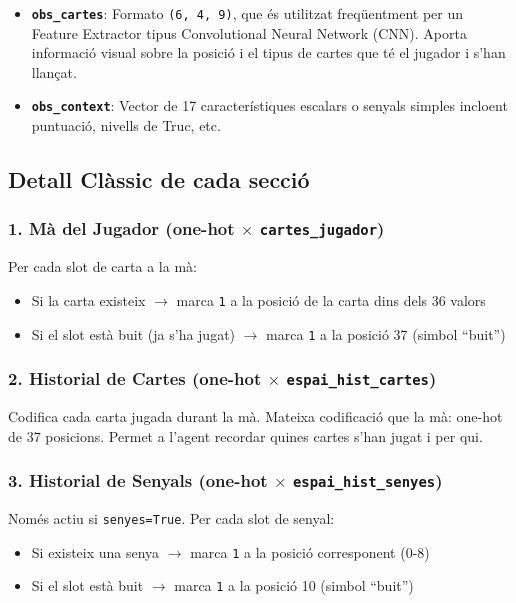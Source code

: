 \documentclass[a4paper,11pt]{report}
\begin{document}
\begin{itemize}
    \item \textbf{\texttt{obs\_cartes}}: Formato \texttt{(6, 4, 9)}, que és utilitzat freqüentment per un Feature Extractor tipus Convolutional Neural Network (CNN). Aporta informació visual sobre la posició i el tipus de cartes que té el jugador i s'han llançat.
    \item \textbf{\texttt{obs\_context}}: Vector de 17 característiques escalars o senyals simples incloent puntuació, nivells de Truc, etc.
\end{itemize}

\subsection{Detall Clàssic de cada secció}

\subsubsection{1. Mà del Jugador (one-hot $\times$ \texttt{cartes\_jugador})}

Per cada slot de carta a la mà:
\begin{itemize}
    \item Si la carta existeix $\rightarrow$ marca \texttt{1} a la posició de la carta dins dels 36 valors
    \item Si el slot està buit (ja s'ha jugat) $\rightarrow$ marca \texttt{1} a la posició 37 (simbol ``buit'')
\end{itemize}

\subsubsection{2. Historial de Cartes (one-hot $\times$ \texttt{espai\_hist\_cartes})}

Codifica cada carta jugada durant la mà. Mateixa codificació que la mà: one-hot de 37 posicions. Permet a l'agent recordar quines cartes s'han jugat i per qui.

\subsubsection{3. Historial de Senyals (one-hot $\times$ \texttt{espai\_hist\_senyes})}

Només actiu si \texttt{senyes=True}. Per cada slot de senyal:
\begin{itemize}
    \item Si existeix una senya $\rightarrow$ marca \texttt{1} a la posició corresponent (0-8)
    \item Si el slot està buit $\rightarrow$ marca \texttt{1} a la posició 10 (simbol ``buit'')
\end{itemize}
\end{document}
